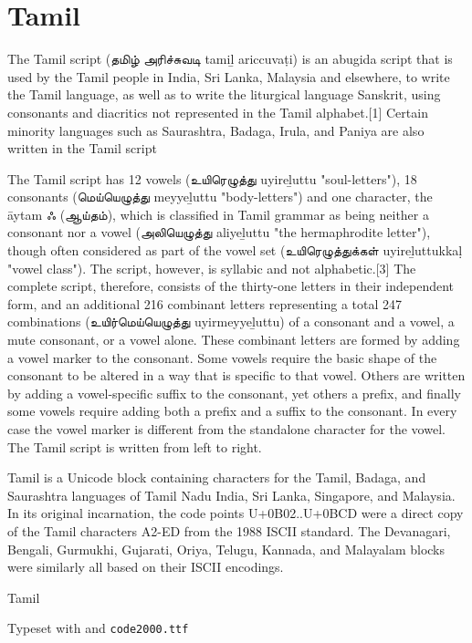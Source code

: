 \section{Tamil}
\newfontfamily{}

\def\tamiltext#1{{\tamil#1}}

The Tamil script (\tamiltext{தமிழ் அரிச்சுவடி} tamiḻ ariccuvaṭi) is an abugida script that is used by the Tamil people in India, Sri Lanka, Malaysia and elsewhere, to write the Tamil language, as well as to write the liturgical language Sanskrit, using consonants and diacritics not represented in the Tamil alphabet.[1] Certain minority languages such as Saurashtra, Badaga, Irula, and Paniya are also written in the Tamil script

The Tamil script has 12 vowels (\tamiltext{உயிரெழுத்து} uyireḻuttu "soul-letters"), 18 consonants (\tamiltext{மெய்யெழுத்து} meyyeḻuttu "body-letters") and one character, the āytam \tamiltext{ஃ (ஆய்தம்)}, which is classified in Tamil grammar as being neither a consonant nor a vowel (\tamiltext{அலியெழுத்து} aliyeḻuttu "the hermaphrodite letter"), though often considered as part of the vowel set (\tamiltext{உயிரெழுத்துக்கள்} uyireḻuttukkaḷ "vowel class"). The script, however, is syllabic and not alphabetic.[3] The complete script, therefore, consists of the thirty-one letters in their independent form, and an additional 216 combinant letters representing a total 247 combinations (\tamiltext{உயிர்மெய்யெழுத்து} uyirmeyyeḻuttu) of a consonant and a vowel, a mute consonant, or a vowel alone. These combinant letters are formed by adding a vowel marker to the consonant. Some vowels require the basic shape of the consonant to be altered in a way that is specific to that vowel. Others are written by adding a vowel-specific suffix to the consonant, yet others a prefix, and finally some vowels require adding both a prefix and a suffix to the consonant. In every case the vowel marker is different from the standalone character for the vowel.
The Tamil script is written from left to right.

Tamil is a Unicode block containing characters for the Tamil, Badaga, and Saurashtra languages of Tamil Nadu India, Sri Lanka, Singapore, and Malaysia. In its original incarnation, the code points U+0B02..U+0BCD were a direct copy of the Tamil characters A2-ED from the 1988 ISCII standard. The Devanagari, Bengali, Gurmukhi, Gujarati, Oriya, Telugu, Kannada, and Malayalam blocks were similarly all based on their ISCII encodings.

\begin{scriptexample}[]{Tamil}

\hfill  Typeset with \cmd{\tamil} and \texttt{code2000.ttf}
\end{scriptexample}













